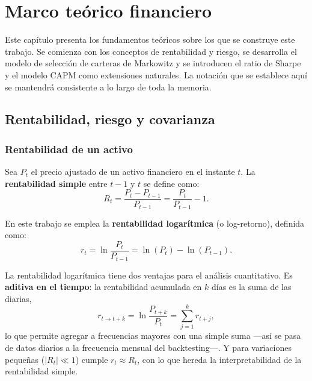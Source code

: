 \chapter{Marco teórico financiero}
\label{ch:marco-teorico}

Este capítulo presenta los fundamentos teóricos sobre los que se construye
este trabajo. Se comienza con los conceptos de rentabilidad y riesgo, se
desarrolla el modelo de selección de carteras de Markowitz y se introducen
el ratio de Sharpe y el modelo CAPM como extensiones naturales.
La notación que se establece aquí se mantendrá consistente a lo largo de
toda la memoria.

\section{Rentabilidad, riesgo y covarianza}

\subsection{Rentabilidad de un activo}

Sea $P_t$ el precio ajustado de un activo financiero en el instante $t$.
La \textbf{rentabilidad simple} entre $t-1$ y $t$ se define como:
\begin{equation}
    R_t = \frac{P_t - P_{t-1}}{P_{t-1}} = \frac{P_t}{P_{t-1}} - 1.
    \label{eq:rentabilidad-simple}
\end{equation}

En este trabajo se emplea la \textbf{rentabilidad logarítmica} (o
log-retorno), definida como:
\begin{equation}
    r_t = \ln \frac{P_t}{P_{t-1}} = \ln(P_t) - \ln(P_{t-1}).
    \label{eq:rentabilidad-log}
\end{equation}

La rentabilidad logarítmica tiene dos ventajas para el análisis cuantitativo.
Es \textbf{aditiva en el tiempo}: la rentabilidad acumulada en $k$ días es la
suma de las diarias,
\begin{equation}
    r_{t \to t+k} = \ln \frac{P_{t+k}}{P_t} = \sum_{j=1}^{k} r_{t+j},
    \label{eq:aditividad-log}
\end{equation}
lo que permite agregar a frecuencias mayores con una simple suma ---así se pasa
de datos diarios a la frecuencia mensual del backtesting---. Y para variaciones
pequeñas ($|R_t| \ll 1$) cumple $r_t \approx R_t$, con lo que hereda la
interpretabilidad de la rentabilidad simple.

